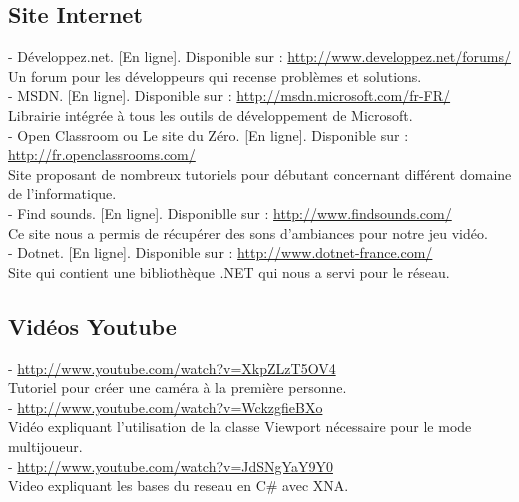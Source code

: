 \documentclass[12pt]{article}
\begin{document}
\subsection{Site Internet}
\noindent
- Développez.net. [En ligne]. Disponible sur : \underline{http://www.developpez.net/forums/} \\
Un forum pour les développeurs qui recense problèmes et solutions. \\
- MSDN. [En ligne]. Disponible sur :  \underline{http://msdn.microsoft.com/fr-FR/} \\
Librairie intégrée à tous les outils de développement de Microsoft. \\
- Open Classroom ou Le site du Zéro. [En ligne]. Disponible sur : \underline{http://fr.openclassrooms.com/} \\
Site proposant de nombreux tutoriels pour débutant concernant différent domaine de l'informatique. \\
- Find sounds. [En ligne]. Disponiblle sur :  \underline{http://www.findsounds.com/} \\
Ce site nous a permis de récupérer des sons d'ambiances pour notre jeu vidéo.\\
- Dotnet. [En ligne]. Disponible sur :  \underline{http://www.dotnet-france.com/} \\
Site qui contient une bibliothèque .NET qui nous a servi pour le réseau. 
\subsection{Vidéos Youtube}
\noindent
-  \underline{http://www.youtube.com/watch?v=XkpZLzT5OV4} \\
Tutoriel pour créer une caméra à la première personne. \\
-  \underline{http://www.youtube.com/watch?v=WckzgfieBXo} \\
Vidéo expliquant l'utilisation de la classe Viewport nécessaire pour le mode multijoueur. \\
-  \underline{http://www.youtube.com/watch?v=JdSNgYaY9Y0} \\
Video expliquant les bases du reseau en C\# avec XNA. 

\newpage

\thispagestyle{empty}
\pagestyle{fancyplain} \chead{} 
\listoffigures
\end{document}
